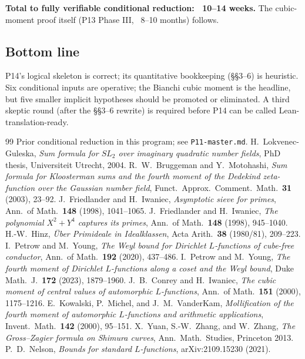 \documentclass[11pt]{article}
\theoremstyle{definition}
\begin{document}
\textbf{Total to fully verifiable conditional reduction: ~10--14 weeks.} The cubic-moment proof itself (P13 Phase III, ~8--10 months) follows.

\subsection*{Bottom line}

P14's logical skeleton is correct; its quantitative bookkeeping (§§3--6) is heuristic. Six conditional inputs are operative; the Bianchi cubic moment is the headline, but five smaller implicit hypotheses should be promoted or eliminated. A third skeptic round (after the §§3--6 rewrite) is required before P14 can be called Lean-translation-ready.


\begin{thebibliography}{99}
 Prior conditional reduction in this program; see \texttt{P11-master.md}.
 H.~Lokvenec-Guleska, \emph{Sum formula for $SL_2$ over imaginary quadratic number fields}, PhD thesis, Universiteit Utrecht, 2004.
 R.~W.~Bruggeman and Y.~Motohashi, \emph{Sum formula for Kloosterman sums and the fourth moment of the Dedekind zeta-function over the Gaussian number field}, Funct.\ Approx.\ Comment.\ Math.\ \textbf{31} (2003), 23--92.
 J.~Friedlander and H.~Iwaniec, \emph{Asymptotic sieve for primes}, Ann.\ of Math.\ \textbf{148} (1998), 1041--1065.
 J.~Friedlander and H.~Iwaniec, \emph{The polynomial $X^2+Y^4$ captures its primes}, Ann.\ of Math.\ \textbf{148} (1998), 945--1040.
 H.-W.~Hinz, \emph{Über Primideale in Idealklassen}, Acta Arith.\ \textbf{38} (1980/81), 209--223.
 I.~Petrow and M.~Young, \emph{The Weyl bound for Dirichlet $L$-functions of cube-free conductor}, Ann.\ of Math.\ \textbf{192} (2020), 437--486.
 I.~Petrow and M.~Young, \emph{The fourth moment of Dirichlet $L$-functions along a coset and the Weyl bound}, Duke Math.\ J.\ \textbf{172} (2023), 1879--1960.
 J.~B.~Conrey and H.~Iwaniec, \emph{The cubic moment of central values of automorphic $L$-functions}, Ann.\ of Math.\ \textbf{151} (2000), 1175--1216.
 E.~Kowalski, P.~Michel, and J.~M.~VanderKam, \emph{Mollification of the fourth moment of automorphic $L$-functions and arithmetic applications}, Invent.\ Math.\ \textbf{142} (2000), 95--151.
 X.~Yuan, S.-W.~Zhang, and W.~Zhang, \emph{The Gross--Zagier formula on Shimura curves}, Ann.\ Math.\ Studies, Princeton 2013.
 P.~D.~Nelson, \emph{Bounds for standard $L$-functions}, arXiv:2109.15230 (2021).
\end{thebibliography}
\end{document}
